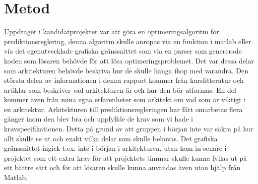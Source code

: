 \section{Metod}
Uppdraget i kandidatprojektet var att göra en optimeringsalgoritm för prediktionsreglering, denna algoritm skulle anropas via en funktion i matlab eller via det egenutvecklade grafiska gränssnittet som via en parser som genererade koden som lösaren behövde för att lösa optimeringsproblemet. Det var dessa delar som arkitekturen behövde beskriva hur de skulle hänga ihop med varandra.
\newline
\newline
Den största delen av informationen i denna rapport kommer från kurslitteratur och artiklar som beskriver vad arkitekturen är och hur den bör utformas. En del kommer även från mina egna erfarenheter som arkitekt om vad som är viktigt i en arkitektur.
\newline
\newline
Arkitekturen till prediktionsregleringen har fått omarbetas flera gånger inom den blev bra och uppfyllde de krav som vi hade i kravspecifikationen. Detta på grund av att gruppen i början inte var säkra på hur allt skulle se ut och exakt vilka delar som skulle behövas. Det grafiska gränssnittet ingick t.ex. inte i början i arkitekturen, utan kom in senare i projektet som ett extra krav för att projektets timmar skulle kunna fyllas ut på ett bättre sätt och för att lösaren skulle kunna användas även utan hjälp från Matlab.

 
